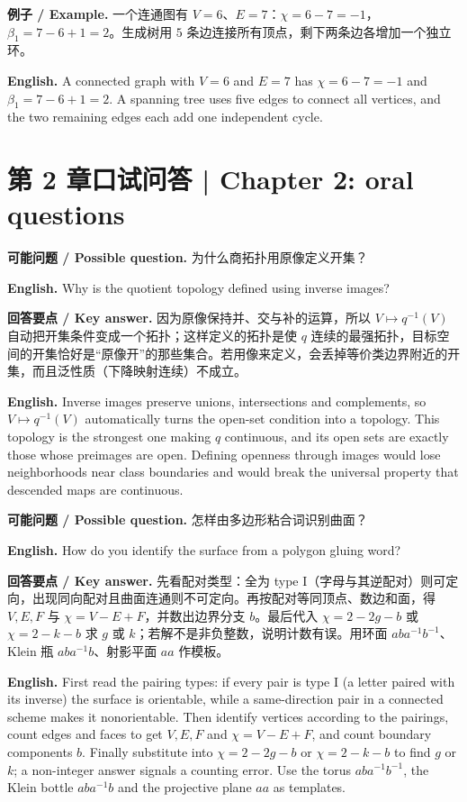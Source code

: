 \documentclass[UTF8,11pt,a4paper]{ctexart}
\newcommand{\EN}[1]{\par\noindent\textbf{English.} #1\par}
\newcommand{\EX}[2]{\par\noindent\textbf{例子 / Example.} #1\par\EN{#2}}
\newcommand{\ASK}[4]{\par\noindent\textbf{可能问题 / Possible question.} #1\par\EN{#2}\noindent\textbf{回答要点 / Key answer.} #3\par\EN{#4}\medskip}
\begin{document}
\EX{一个连通图有 $V=6$、$E=7$：$\chi=6-7=-1$，$\beta_1=7-6+1=2$。生成树用 $5$ 条边连接所有顶点，剩下两条边各增加一个独立环。}{A connected graph with $V=6$ and $E=7$ has $\chi=6-7=-1$ and $\beta_1=7-6+1=2$. A spanning tree uses five edges to connect all vertices, and the two remaining edges each add one independent cycle.}

\section*{第 2 章口试问答 | Chapter 2: oral questions}
\ASK{为什么商拓扑用原像定义开集？}{Why is the quotient topology defined using inverse images?}{因为原像保持并、交与补的运算，所以 $V\mapsto q^{-1}(V)$ 自动把开集条件变成一个拓扑；这样定义的拓扑是使 $q$ 连续的最强拓扑，目标空间的开集恰好是“原像开”的那些集合。若用像来定义，会丢掉等价类边界附近的开集，而且泛性质（下降映射连续）不成立。}{Inverse images preserve unions, intersections and complements, so $V\mapsto q^{-1}(V)$ automatically turns the open-set condition into a topology. This topology is the strongest one making $q$ continuous, and its open sets are exactly those whose preimages are open. Defining openness through images would lose neighborhoods near class boundaries and would break the universal property that descended maps are continuous.}

\ASK{怎样由多边形粘合词识别曲面？}{How do you identify the surface from a polygon gluing word?}{先看配对类型：全为 type I（字母与其逆配对）则可定向，出现同向配对且曲面连通则不可定向。再按配对等同顶点、数边和面，得 $V,E,F$ 与 $\chi=V-E+F$，并数出边界分支 $b$。最后代入 $\chi=2-2g-b$ 或 $\chi=2-k-b$ 求 $g$ 或 $k$；若解不是非负整数，说明计数有误。用环面 $aba^{-1}b^{-1}$、Klein 瓶 $aba^{-1}b$、射影平面 $aa$ 作模板。}{First read the pairing types: if every pair is type I (a letter paired with its inverse) the surface is orientable, while a same-direction pair in a connected scheme makes it nonorientable. Then identify vertices according to the pairings, count edges and faces to get $V,E,F$ and $\chi=V-E+F$, and count boundary components $b$. Finally substitute into $\chi=2-2g-b$ or $\chi=2-k-b$ to find $g$ or $k$; a non-integer answer signals a counting error. Use the torus $aba^{-1}b^{-1}$, the Klein bottle $aba^{-1}b$ and the projective plane $aa$ as templates.}
\end{document}
